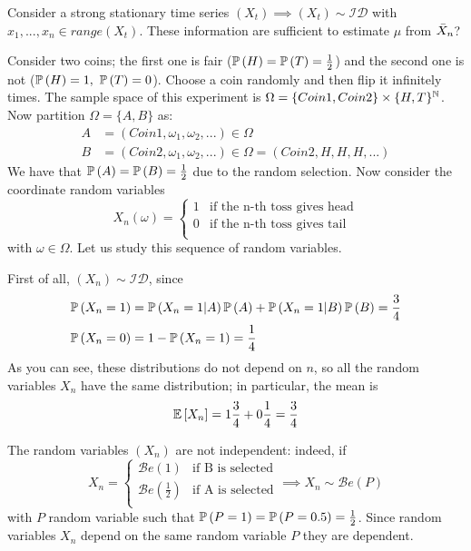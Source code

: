 \begin{example}
    Consider a strong stationary time series $(X_t)\implies(X_t)\sim\mathcal{ID}$ with $x_1,...,x_n\in range(X_t)$. These information are sufficient to estimate $\mu$ from $\bar{X}_n$?

    Consider two coins; the first one is fair ($\mathbb{P}\left(H\right)=\mathbb{P}\left(T\right)=\frac{1}{2}$) and the second one is not ($\prob{H}= 1,\ \prob{T}=0$). Choose a coin randomly and then flip it infinitely times. The sample space of this experiment is $\Omega=\{Coin1,Coin2\}\times\{H,T\}^{\mathbb{N}}$. Now partition $\Omega=\{A,B\}$ as:
    \begin{equation*}
        \begin{split}
            A&={(Coin1,\omega_1,\omega_2,...)\in\Omega}\\
            B&={(Coin2,\omega_1,\omega_2,...)\in\Omega} = {(Coin2,H,H,H,...)}
        \end{split}
    \end{equation*}
    We have that $\mathbb{P}\left(A\right)=\mathbb{P}\left(B\right)=\frac{1}{2}$ due to the random selection. Now consider the coordinate random variables
    \begin{equation*}
        X_n(\omega)=\begin{cases}
            1 & \text{if the n-th toss gives head}\\
            0 & \text{if the n-th toss gives tail}\\
        \end{cases}
    \end{equation*}
    with $\omega\in\Omega$. Let us study this sequence of random variables.

    First of all, $(X_n)\sim\mathcal{ID}$, since 
    \begin{equation*}
        \begin{split}
            \mathbb{P}\left(X_n=1\right)&=\mathbb{P}\left(X_n=1|A\right)\mathbb{P}\left(A\right)+\mathbb{P}\left(X_n=1|B\right)\mathbb{P}\left(B\right)=\frac{3}{4}\\
            \mathbb{P}\left(X_n=0\right)&=1-\mathbb{P}\left(X_n=1\right)=\frac{1}{4}
        \end{split}
    \end{equation*}
    As you can see, these distributions do not depend on $n$, so all the random variables $X_n$ have the same distribution; in particular, the mean is
    \[
        \mathbb{E}\left[X_n\right]=1\frac{3}{4}+0\frac{1}{4}=\frac{3}{4}
    \]
    
    The random variables $(X_n)$ are not independent: indeed, if
    \begin{equation*}
        X_n=\begin{cases}
            \mathcal{B}e(1) & \text{if B is selected}\\
            \mathcal{B}e(\frac{1}{2}) & \text{if A is selected}\\
        \end{cases}
        \implies X_n\sim\mathcal{B}e(P)
    \end{equation*}
    with $P$ random variable such that $\mathbb{P}\left(P=1\right)=\mathbb{P}\left(P=0.5\right)=\frac{1}{2}$. Since random variables $X_n$ depend on the same random variable $P$ they are dependent.
    

\end{example}
